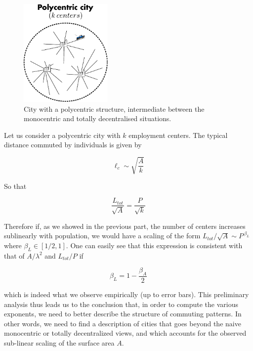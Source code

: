 \begin{figure}[!h]
    \centering
    \includegraphics[width=0.4\textwidth]{gfx/chapter-scaling/polycentric.pdf}
    \caption{City with a polycentric structure, intermediate between the
    monocentric and totally decentralised situations. \label{fig:polycentric}}
\end{figure}

Let us consider a polycentric city with $k$ employment centers. The typical
distance commuted by individuals is given by

\begin{equation}
    \ell_c \sim \sqrt{\frac{A}{k}}
\end{equation}

So that

\begin{equation}
    \frac{L_{tot}}{\sqrt{A}} = \frac{P}{\sqrt{k}}
\end{equation}

Therefore if, as we showed in the previous part,  the number of centers
increases sublinearly with population, we would have a scaling of the form
$L_{tot}/\sqrt{A}\sim P^{\,\beta_L}$ where $\beta_L \in [1/2,1]$. One
can easily see that this expression is consistent with that of $A/\lambda^2$ and
$L_{tot}/P$ if

\begin{equation} 
    \beta_L = 1-\frac{\beta_A}{2} 
    \label{eq:consis} 
\end{equation}

which is indeed what we observe empirically (up to error bars). This preliminary
analysis thus leads us to the conclusion that, in order to compute the various
exponents, we need to better describe the structure of commuting patterns. In
other words, we need to find a description of cities that goes beyond the naive
monocentric or totally decentralized views, and which accounts for the observed
sub-linear scaling of the surface area $A$.






